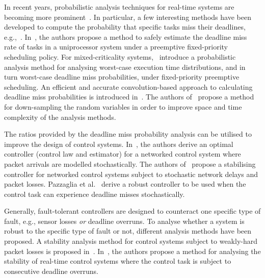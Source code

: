 In recent years, probabilistic analysis techniques for real-time systems are becoming more prominent~\cite{Cucu-Grosjean:2019}.
In particular, a few interesting methods have been developed to compute the probability that specific tasks miss their deadlines, e.g.,~\cite{Bruggen:2021}.
In~\cite{Bruggen:2018a}, the authors propose a method to safely estimate the deadline miss rate of tasks in a uniprocessor system under a preemptive fixed-priority scheduling policy.
For mixed-criticality systems,~\cite{Cucu-Grosjean:2017} introduce a probabilistic analysis method for analysing worst-case execution time distributions, and in turn worst-case deadline miss probabilities, under fixed-priority preemptive scheduling.
An efficient and accurate convolution-based approach to calculating deadline miss probabilities is introduced in~\cite{Bruggen:2018b}.
The authors of~\cite{Markovic:2021} propose a method for down-sampling the random variables in order to improve space and time complexity of the analysis methods.

The ratios provided by the deadline miss probability analysis can be utilised to improve the design of control systems.
In~\cite{Schenato:2007}, the authors derive an optimal controller (control law and estimator) for a networked control system where packet arrivals are modelled stochastically.
The authors of~\cite{Heemels:2010} propose a stabilising controller for networked control systems subject to stochastic network delays and packet losses.
Pazzaglia et al.~\cite{Pazzaglia:2019} derive a robust controller to be used when the control task can experience deadline misses stochastically.

Generally, fault-tolerant controllers are designed to counteract one specific type of fault, e.g., sensor losses \emph{or} deadline overruns.
To analyse whether a system is robust to the specific type of fault or not, different analysis methods have been proposed.
A stability analysis method for control systems subject to weakly-hard packet losses is proposed in~\cite{Linsenmayer:2020}.
In~\cite{Maggio:2020}, the authors propose a method for analysing the stability of real-time control systems where the control task is subject to consecutive deadline overruns.

